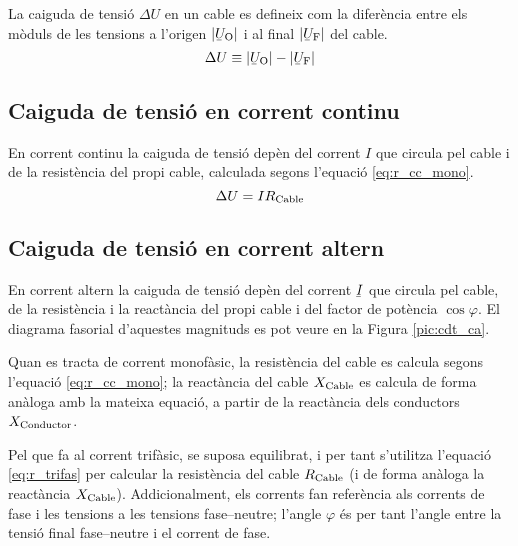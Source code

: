 La caiguda de tensió $\Delta U$ en un cable es defineix com la diferència entre els mòduls de les tensions a l'origen $|{\cmplx{U}\ped{O}}|$ i al final $|\cmplx{U}\ped{F}|$ del cable.
\begin{equation}
   \Delta U \equiv |\cmplx{U}\ped{O}| - |\cmplx{U}\ped{F}|
\end{equation}

\subsection{Caiguda de tensió en corrent continu}

En corrent continu la caiguda de tensió depèn del corrent $I$ que circula pel cable i de la  resistència del propi cable, calculada segons l'equació \eqref{eq:r_cc_mono}.
\begin{equation}
   \Delta U = I R_\mathrm{Cable}
\end{equation}

\subsection{Caiguda de tensió en corrent altern}

En corrent altern la caiguda de tensió
depèn del  corrent $\cmplx{I}$ que circula pel cable, de la
resistència i la reactància del propi cable i del factor de
potència $\cos \varphi$. El diagrama fasorial d'aquestes magnituds
es pot veure en la Figura \vref{pic:cdt_ca}.

\begin{center}
   
   \label{pic:cdt_ca}
\end{center}

Quan es tracta de corrent monofàsic, la resistència del cable es calcula segons l'equació
\eqref{eq:r_cc_mono}; la reactància del cable $X_\mathrm{Cable}$ es calcula de forma anàloga
amb la mateixa equació, a partir de la reactància dels conductors $X_\mathrm{Conductor}$.

Pel que fa al corrent trifàsic, se suposa equilibrat, i per tant s'utilitza l'equació
\eqref{eq:r_trifas} per calcular la resistència del cable $R_\mathrm{Cable}$ (i de forma
anàloga la reactància $X_\mathrm{Cable}$). Addicionalment, els corrents fan referència als
corrents de fase i les tensions a les tensions fase--neutre; l'angle $\varphi$ és per
tant l'angle entre la tensió final fase--neutre i el corrent de fase.

